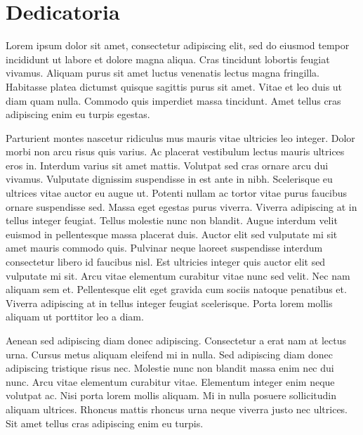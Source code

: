 \section*{Dedicatoria}
Lorem ipsum dolor sit amet, consectetur adipiscing elit, sed do eiusmod tempor incididunt ut labore et dolore magna aliqua. Cras tincidunt lobortis feugiat vivamus. Aliquam purus sit amet luctus venenatis lectus magna fringilla. Habitasse platea dictumst quisque sagittis purus sit amet. Vitae et leo duis ut diam quam nulla. Commodo quis imperdiet massa tincidunt. Amet tellus cras adipiscing enim eu turpis egestas.

Parturient montes nascetur ridiculus mus mauris vitae ultricies leo integer. Dolor morbi non arcu risus quis varius. Ac placerat vestibulum lectus mauris ultrices eros in. Interdum varius sit amet mattis. Volutpat sed cras ornare arcu dui vivamus. Vulputate dignissim suspendisse in est ante in nibh. Scelerisque eu ultrices vitae auctor eu augue ut. Potenti nullam ac tortor vitae purus faucibus ornare suspendisse sed. Massa eget egestas purus viverra. Viverra adipiscing at in tellus integer feugiat. Tellus molestie nunc non blandit. Augue interdum velit euismod in pellentesque massa placerat duis. Auctor elit sed vulputate mi sit amet mauris commodo quis. Pulvinar neque laoreet suspendisse interdum consectetur libero id faucibus nisl. Est ultricies integer quis auctor elit sed vulputate mi sit. Arcu vitae elementum curabitur vitae nunc sed velit. Nec nam aliquam sem et. Pellentesque elit eget gravida cum sociis natoque penatibus et. Viverra adipiscing at in tellus integer feugiat scelerisque. Porta lorem mollis aliquam ut porttitor leo a diam.

Aenean sed adipiscing diam donec adipiscing. Consectetur a erat nam at lectus urna. Cursus metus aliquam eleifend mi in nulla. Sed adipiscing diam donec adipiscing tristique risus nec. Molestie nunc non blandit massa enim nec dui nunc. Arcu vitae elementum curabitur vitae. Elementum integer enim neque volutpat ac. Nisi porta lorem mollis aliquam. Mi in nulla posuere sollicitudin aliquam ultrices. Rhoncus mattis rhoncus urna neque viverra justo nec ultrices. Sit amet tellus cras adipiscing enim eu turpis.